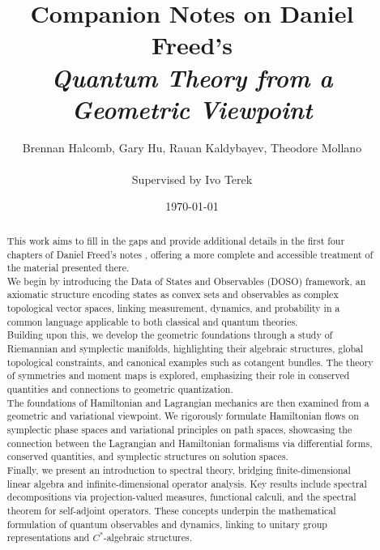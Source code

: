\documentclass{article}
\title{Companion Notes on Daniel Freed's \\ 
\textit{Quantum Theory from a Geometric Viewpoint}}
\author{
  Brennan Halcomb, Gary Hu, Rauan Kaldybayev, Theodore Mollano\\
  \vspace{0.5em}
  
  Supervised by Ivo Terek\\
}
\date{\today}
\theoremstyle{definition} \newtheorem{definition}[dummy]{Definition}
\theoremstyle{definition} \newtheorem{example}[dummy]{Example}
\numberwithin{equation}{section}
\begin{document}
\maketitle

\begin{abstract}

\noindent This work aims to fill in the gaps and provide additional details in the first four chapters of Daniel Freed's notes \cite{freed}, offering a more complete and accessible treatment of the material presented there. \\ 

\noindent We begin by introducing the Data of States and Observables (DOSO) framework, an axiomatic structure encoding states as convex sets and observables as complex topological vector spaces, linking measurement, dynamics, and probability in a common language applicable to both classical and quantum theories.\\

\noindent Building upon this, we develop the geometric foundations through a study of Riemannian and symplectic manifolds, highlighting their algebraic structures, global topological constraints, and canonical examples such as cotangent bundles. The theory of symmetries and moment maps is explored, emphasizing their role in conserved quantities and connections to geometric quantization. \\

\noindent The foundations of Hamiltonian and Lagrangian mechanics are then examined from a geometric and variational viewpoint. We rigorously formulate Hamiltonian flows on symplectic phase spaces and variational principles on path spaces, showcasing the connection between the Lagrangian and Hamiltonian formalisms via differential forms, conserved quantities, and symplectic structures on solution spaces.\\

\noindent Finally, we present an introduction to spectral theory, bridging finite-dimensional linear algebra and infinite-dimensional operator analysis. Key results include spectral decompositions via projection-valued measures, functional calculi, and the spectral theorem for self-adjoint operators. These concepts underpin the mathematical formulation of quantum observables and dynamics, linking to unitary group representations and $C^*$-algebraic structures.

\end{abstract}

\newpage
\setcounter{tocdepth}{2}
\tableofcontents








% 
% 
% 
% 
% 

% 

%  


%
\newpage
\printbibliography
\end{document}
